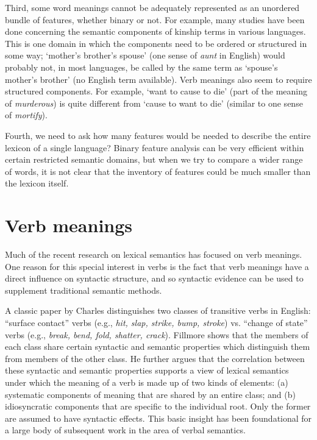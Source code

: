 Third, some word meanings cannot be adequately represented as an unordered bundle of features, whether binary or not. For example, many studies have been done concerning the semantic components of kinship terms in various languages. This is one domain in which the components need to be ordered or structured in some way; ‘mother’s brother’s spouse’ (one sense of \textit{aunt} in English) would probably not, in most languages, be called by the same term as ‘spouse’s mother’s brother’ (no English term available). Verb meanings also seem to require structured components. For example, ‘want to cause to die’ (part of the meaning of \textit{murderous}) is quite different from ‘cause to want to die’ (similar to one sense of \textit{mortify}).



Fourth, we need to ask how many features would be needed to describe the entire lexicon of a single language? Binary feature analysis can be very efficient within certain restricted semantic domains, but when we try to compare a wider range of words, it is not clear that the inventory of features could be much smaller than the lexicon itself.


\section{Verb meanings}\label{sec:} %

Much of the recent research on lexical semantics has focused on verb meanings. One reason for this special interest in verbs is the fact that verb meanings have a direct influence on syntactic structure, and so syntactic evidence can be used to supplement traditional semantic methods.



A classic paper by Charles \citet{Fillmore1970} distinguishes two classes of transitive verbs in English: “surface contact” verbs (e.g., \textit{hit, slap, strike, bump, stroke}) vs. “change of state” verbs (e.g., \textit{break, bend, fold, shatter, crack}). Fillmore shows that the members of each class share certain syntactic and semantic properties which distinguish them from members of the other class. He further argues that the correlation between these syntactic and semantic properties supports a view of lexical semantics under which the meaning of a verb is made up of two kinds of elements: (a) systematic components of meaning that are shared by an entire class; and (b) idiosyncratic components that are specific to the individual root. Only the former are assumed to have syntactic effects. This basic insight has been foundational for a large body of subsequent work in the area of verbal semantics.



